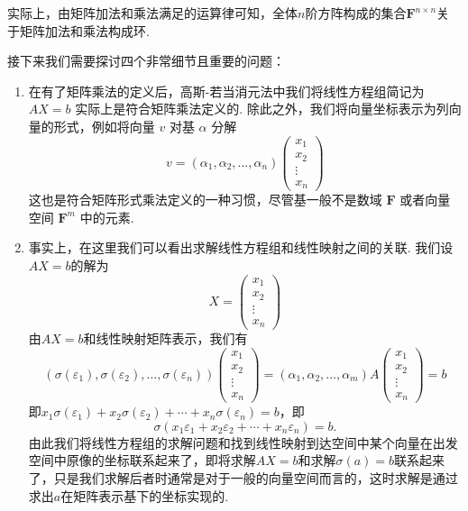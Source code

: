实际上，由矩阵加法和乘法满足的运算律可知，全体$n$阶方阵构成的集合$\mathbf{F}^{n\times n}$关于矩阵加法和乘法构成环.

接下来我们需要探讨四个非常细节且重要的问题：
\begin{enumerate}
    \item 在有了矩阵乘法的定义后，高斯-若当消元法中我们将线性方程组简记为 $AX = b$ 实际上是符合矩阵乘法定义的. 除此之外，我们将向量坐标表示为列向量的形式，例如将向量 $v$ 对基 $\alpha$ 分解
          \[v=(\alpha_1,\alpha_2,\ldots,\alpha_n)\begin{pmatrix}
                  x_1 \\ x_2 \\ \vdots \\ x_n
              \end{pmatrix}\]
          这也是符合矩阵形式乘法定义的一种习惯，尽管基一般不是数域 $\mathbf{F}$ 或者向量空间 $\mathbf{F}^m$ 中的元素.

    \item 事实上，在这里我们可以看出求解线性方程组和线性映射之间的关联. 我们设$AX=b$的解为
          \[X=\begin{pmatrix}
                  x_1 \\ x_2 \\ \vdots \\ x_n
              \end{pmatrix}\]
          由$AX=b$和线性映射矩阵表示，我们有
          \begin{equation}\label{eq:7:方程组与核空间1}
              (\sigma(\varepsilon_1),\sigma(\varepsilon_2),\ldots,\sigma(\varepsilon_n))\begin{pmatrix}
                  x_1 \\ x_2 \\ \vdots \\ x_n
              \end{pmatrix}=(\alpha_1,\alpha_2,\ldots,\alpha_m)A\begin{pmatrix}
                  x_1 \\ x_2 \\ \vdots \\ x_n
              \end{pmatrix}=b
          \end{equation}
          即$x_1\sigma(\varepsilon_1)+x_2\sigma(\varepsilon_2)+\cdots+x_n\sigma(\varepsilon_n)=b$，即
          \begin{equation}\label{eq:7:方程组与核空间2}
              \sigma(x_1\varepsilon_1+x_2\varepsilon_2+\cdots+x_n\varepsilon_n)=b.
          \end{equation}
          由此我们将线性方程组的求解问题和找到线性映射到达空间中某个向量在出发空间中原像的坐标联系起来了，即将求解$AX=b$和求解$\sigma(a)=b$联系起来了，只是我们求解后者时通常是对于一般的向量空间而言的，这时求解是通过求出$a$在矩阵表示基下的坐标实现的.


\end{enumerate}
